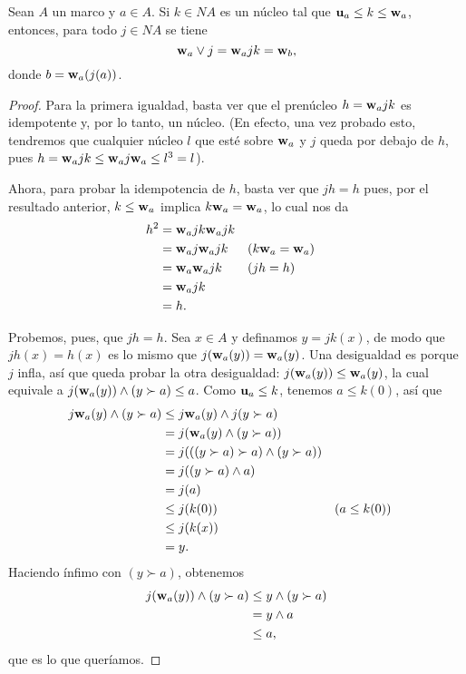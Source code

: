 \begin{theorem}
    Sean $A$ un marco y $a\in A$.
    Si $k\in NA$ es un núcleo tal que $\mathbf u_{a}\leq k\leq\mathbf w_{a}$,
    entonces, para todo $j\in NA$ se tiene
    \[
        \mathbf w_{a}\vee j = \mathbf w_{a} j k = \mathbf w_{b}
    ,\]
    donde $b=\mathbf w_{a}(j(a))$.
\end{theorem}
\begin{proof}
    Para la primera igualdad,
    basta ver que el prenúcleo $h=\mathbf w_{a}jk$ es idempotente
    y, por lo tanto, un núcleo.
    (En efecto, una vez probado esto, tendremos que
    cualquier núcleo $l$ que esté sobre $\mathbf w_{a}$ y $j$ queda
    por debajo de $h$, pues
    $h=\mathbf w_{a}jk\leq\mathbf w_{a}j\mathbf w_{a}\leq l^3=l$).
    
    Ahora, para probar la idempotencia de $h$,
    basta ver que $jh=h$ pues,
    por el resultado anterior,
    $k\leq\mathbf w_{a}$ implica $k\mathbf w_{a}=\mathbf w_{a}$,
    lo cual nos da
    \begin{align*}
        h^2
        &= \mathbf w_{a}jk\mathbf w_{a}jk \\ 
        &= \mathbf w_{a}j\mathbf w_{a}jk
            && (k\mathbf w_{a}=\mathbf w_{a}) \\ 
        &= \mathbf w_{a}\mathbf w_{a}jk
            && (jh=h)\\ 
        &= \mathbf w_{a}jk \\ 
        &= h.
    \end{align*}
    
    Probemos, pues, que $jh=h$.
    Sea $x\in A$ y definamos $y=jk(x)$,
    de modo que $jh(x)=h(x)$ es lo mismo que
    $j(\mathbf w_{a}(y))=\mathbf w_{a}(y)$.
    Una desigualdad es porque $j$ infla,
    así que queda probar la otra desigualdad:
    $j(\mathbf w_{a}(y))\leq\mathbf w_{a}(y)$,
    la cual equivale a $j(\mathbf w_{a}(y))\wedge(y\succ a)\leq a$.
    Como $\mathbf u_{a}\leq k$, tenemos $a\leq k(0)$, así que
    \begin{align*}
        j\mathbf w_{a}(y)\wedge(y\succ a)
        &\leq j\mathbf w_{a}(y)\wedge j(y\succ a) \\
        &= j(\mathbf w_{a}(y)\wedge (y\succ a)) \\
        &= j(((y\succ a)\succ a)\wedge (y\succ a)) \\
        &= j((y\succ a)\wedge a) \\
        &= j(a) \\
        &\leq j(k(0)) && (a\leq k(0)) \\
        &\leq j(k(x)) \\
        &= y.
    \end{align*}
    Haciendo ínfimo con $(y\succ a)$, obtenemos
    \begin{align*}
        j(\mathbf w_{a}(y))\wedge (y\succ a)
        &\leq y\wedge (y\succ a) \\
        &= y\wedge a \\
        &\leq a,
    \end{align*}
    que es lo que queríamos.
    

\end{proof}
